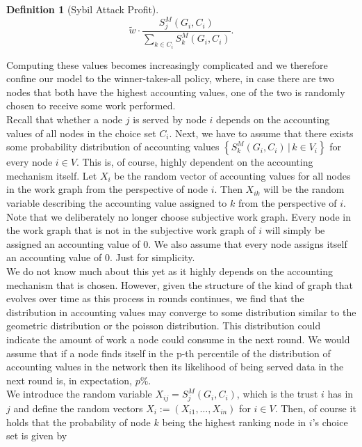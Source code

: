 \documentclass[11pt,a4paper]{article}
\theoremstyle{definition}
\newtheorem{definition}{Definition}[section]
\theoremstyle{theorem}
\theoremstyle{proposition}
\theoremstyle{corollary}
\theoremstyle{lemma}
\theoremstyle{example}
\theoremstyle{remark}
\begin{document}
\begin{definition}[Sybil Attack Profit]
\[
\tilde{w}\cdot\frac{S^M_j(G_i,C_i)}{\sum\limits_{k\in{}C_i}^{}S^M_k(G_i,C_i)}.
\]

\noindent{}Computing these values becomes increasingly complicated and we therefore confine our model to the winner-takes-all policy, where, in case there are two nodes that both have the highest accounting values, one of the two is randomly chosen to receive some work performed. \vspace{1em}\\

\noindent{}Recall that whether a node $j$ is served by node $i$ depends on the accounting values of all nodes in the choice set $C_i$. Next, we have to assume that there exists some probability distribution of accounting values $\left\lbrace{}S^M_k(G_i,C_i)\,|\,k\in{}V_i\right\rbrace$ for every node $i\in{}V$. This is, of course, highly dependent on the accounting mechanism itself. Let $X_i$ be the random vector of accounting values for all nodes in the work graph from the perspective of node $i$. Then $X_{ik}$ will be the random variable describing the accounting value assigned to $k$ from the perspective of $i$. Note that we deliberately no longer choose subjective work graph. Every node in the work graph that is not in the subjective work graph of $i$ will simply be assigned an accounting value of 0. We also assume that every node assigns itself an accounting value of 0. Just for simplicity. \vspace{1em}\\ 

\noindent{}We do not know much about this yet as it highly depends on the accounting mechanism that is chosen. However, given the structure of the kind of graph that evolves over time as this process in rounds continues, we find that the distribution in accounting values may converge to some distribution similar to the geometric distribution or the poisson distribution. This distribution could indicate the amount of work a node could consume in the next round. We would assume that if a node finds itself in the p-th percentile of the distribution of accounting values in the network then its likelihood of being served data in the next round is, in expectation, $p\%$. \vspace{1em}\\

\noindent{}We introduce the random variable $X_{ij}=S^M_j(G_i,C_i)$, which is the trust $i$ has in $j$ and define the random vectors $X_i:=(X_{i1},\ldots,X_{in})$ for $i\in{}V$. Then, of course it holds that the probability of node $k$ being the highest ranking node in $i$'s choice set is given by 


\end{definition}
\end{document}
